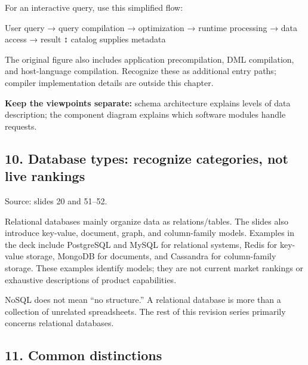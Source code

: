 For an interactive query, use this simplified flow:

\begin{StudyCode}
User query → query compilation → optimization → runtime processing → data access → result
                                                    ↕
                                      catalog supplies metadata
\end{StudyCode}

The original figure also includes application precompilation, DML compilation, and host-language compilation. Recognize these as additional entry paths; compiler implementation details are outside this chapter.

\textbf{Keep the viewpoints separate:} schema architecture explains levels of data description; the component diagram explains which software modules handle requests.

\subsection{10. Database types: recognize categories, not live rankings}\label{01_database_fundamentals_en-database-types-recognize-categories-not-live-rankings}

Source: slides 20 and 51--52.

Relational databases mainly organize data as relations/tables. The slides also introduce key-value, document, graph, and column-family models. Examples in the deck include PostgreSQL and MySQL for relational systems, Redis for key-value storage, MongoDB for documents, and Cassandra for column-family storage. These examples identify models; they are not current market rankings or exhaustive descriptions of product capabilities.

NoSQL does not mean ``no structure.'' A relational database is more than a collection of unrelated spreadsheets. The rest of this revision series primarily concerns relational databases.

\subsection{11. Common distinctions}\label{01_database_fundamentals_en-common-distinctions}


